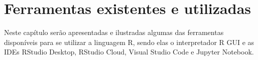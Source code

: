 \chapter{Ferramentas existentes e utilizadas}

  Neste capítulo serão apresentadas e ilustradas algumas das ferramentas disponíveis para se utilizar a linguagem R, sendo elas o interpretador R GUI e as IDEs RStudio Desktop, RStudio Cloud, Visual Studio Code e Jupyter Notebook.
